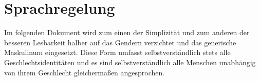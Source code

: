 \thispagestyle{empty}

\section*{Sprachregelung}
Im folgenden Dokument wird zum einen der Simplizität und zum anderen der besseren Lesbarkeit halber auf das Gendern verzichtet und das generische Maskulinum eingesetzt. Diese Form umfasst selbstverständlich stets alle Geschlechtsidentitäten und es sind selbstverständlich alle Menschen unabhängig von ihrem Geschlecht gleichermaßen angesprochen.